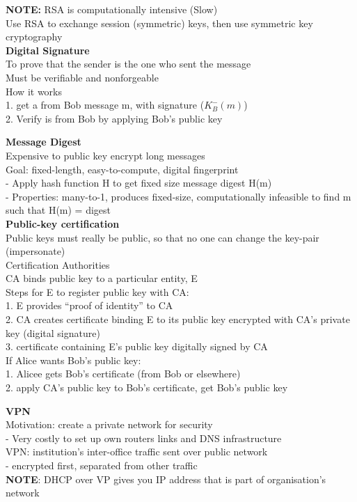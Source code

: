 \documentclass[10pt, a4paper]{article}
\newcommand{\highlight}[1]{{\color{red}\textbf{#1}}}
\newcommand{\blue}[1]{{\color{MidnightBlue}#1}}
\newcommand{\red}[1]{{\color{red}#1}}
\newcommand{\tab}[0]{\hspace*{2mm}}
\begin{document}
\begin{multicols*}{3}
		\highlight{NOTE:} RSA is computationally intensive (Slow)\\
		Use RSA to exchange session (symmetric) keys, then use symmetric key cryptography\\

		\textbf{Digital Signature}\\
		To prove that the sender is the one who sent the message\\
		Must be \blue{verifiable and nonforgeable}\\

		How it works\\
		1. get a from Bob message m, with signature ($K_{B}^{-}(m)$)\\
		2. Verify is from Bob by applying Bob's public key

		\textbf{Message Digest}\\
		Expensive to public key encrypt long messages\\
		\red{Goal}: fixed-length, easy-to-compute, digital fingerprint\\
		- Apply hash function H to get \blue{fixed size message digest H(m)}\\
		- Properties: many-to-1, produces \blue{fixed-size}, computationally infeasible to find m such that H(m) = digest\\

		\textbf{Public-key certification}\\
		Public keys must \blue{really} be public, so that no one can change the key-pair (impersonate)\\

		Certification Authorities\\
		CA binds public key to a particular entity, E\\
		Steps for E to register public key with CA:\\
		1. E provides ``proof of identity'' to CA\\
		2. CA creates certificate binding E to its public key encrypted with CA's private key (digital signature)\\
		3. certificate containing E's public key digitally signed by CA\\

		If Alice wants Bob's public key:\\
		1. Alicee gets Bob's certificate (from Bob or elsewhere)\\
		2. apply CA's public key to Bob's certificate, get Bob's public key

		\textbf{VPN}\\
		\red{Motivation}: create a private network for security\\
		\tab - Very costly to set up own routers links and DNS infrastructure\\
		VPN: institution's inter-office traffic sent over public network\\
		\tab - encrypted first, separated from other traffic\\
		\highlight{NOTE}: DHCP over VP gives you IP address that is part of organisation's network\\


\end{multicols*}
\end{document}
